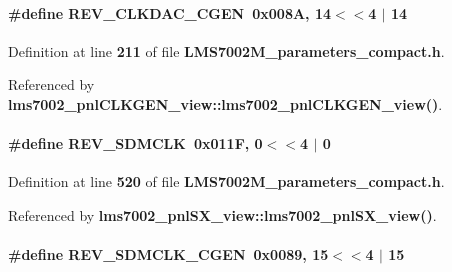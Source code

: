 \paragraph[{R\+E\+V\+\_\+\+C\+L\+K\+D\+A\+C\+\_\+\+C\+G\+EN}]{\setlength{\rightskip}{0pt plus 5cm}\#define R\+E\+V\+\_\+\+C\+L\+K\+D\+A\+C\+\_\+\+C\+G\+EN~0x008\+A, 14$<$$<$4 $\vert$  14}\label{LMS7002M__parameters__compact_8h_ad455ef5ac3dddd91e641d3cbc83ac0f1}


Definition at line {\bf 211} of file {\bf L\+M\+S7002\+M\+\_\+parameters\+\_\+compact.\+h}.



Referenced by {\bf lms7002\+\_\+pnl\+C\+L\+K\+G\+E\+N\+\_\+view\+::lms7002\+\_\+pnl\+C\+L\+K\+G\+E\+N\+\_\+view()}.

\paragraph[{R\+E\+V\+\_\+\+S\+D\+M\+C\+LK}]{\setlength{\rightskip}{0pt plus 5cm}\#define R\+E\+V\+\_\+\+S\+D\+M\+C\+LK~0x011\+F, 0$<$$<$4 $\vert$  0}\label{LMS7002M__parameters__compact_8h_a19b56050f193ce8b073fc105dd10bad7}


Definition at line {\bf 520} of file {\bf L\+M\+S7002\+M\+\_\+parameters\+\_\+compact.\+h}.



Referenced by {\bf lms7002\+\_\+pnl\+S\+X\+\_\+view\+::lms7002\+\_\+pnl\+S\+X\+\_\+view()}.

\paragraph[{R\+E\+V\+\_\+\+S\+D\+M\+C\+L\+K\+\_\+\+C\+G\+EN}]{\setlength{\rightskip}{0pt plus 5cm}\#define R\+E\+V\+\_\+\+S\+D\+M\+C\+L\+K\+\_\+\+C\+G\+EN~0x0089, 15$<$$<$4 $\vert$  15}\label{LMS7002M__parameters__compact_8h_a99f58a1516fd9793508c0cdb3704927b}


